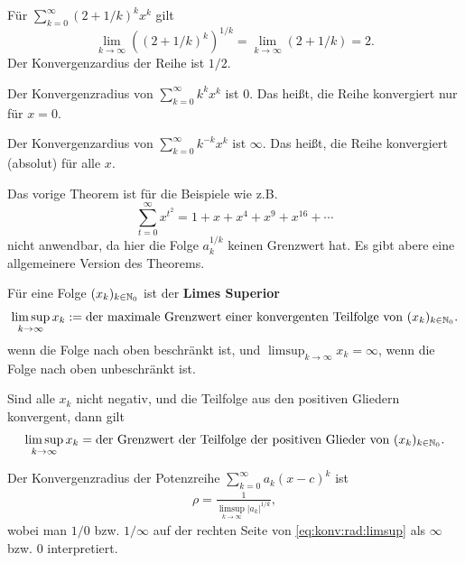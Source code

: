 \begin{bsp} 
	Für $\sum_{k=0}^\infty (2+ 1/k)^k x^k$ gilt 
	\[
		\lim_{k \to \infty} (( 2 + 1/k)^k)^{1/k} = \lim_{k \to \infty} (2 + 1/k)  = 2. 
	\]
	Der Konvergenzardius der Reihe ist $ 1/2$. 
\end{bsp} 

\begin{bsp} 
	Der Konvergenzradius von $\sum_{k=0}^\infty k^k x^k$ ist $0$. Das heißt, die Reihe konvergiert nur für $x=0$. 
\end{bsp} 

\begin{bsp} 
	Der Konvergenzardius von $\sum_{k=0}^\infty k^{-k} x^k$ ist $\infty$. Das heißt, die Reihe konvergiert (absolut) für alle $x$. 
\end{bsp} 

\begin{bem} 
	Das vorige Theorem ist für die Beispiele wie z.B.
	\[
		\sum_{t=0}^\infty x^{t^2} = 1 + x + x^4 + x^9 + x^{16} + \cdots 
	\]
	nicht anwendbar, da hier die Folge $a_k^{1/k}$ keinen Grenzwert hat. Es gibt abere eine allgemeinere Version des Theorems. 
\end{bem} 

\begin{defn} 
	Für eine Folge $(x_k)_{k \in \mathbb{N}_0}$ ist der \textbf{Limes Superior}
	\[
		\limsup_{k \to \infty} x_k := \text{der maximale Grenzwert einer konvergenten Teilfolge von} \ (x_k)_{k \in \mathbb{N}_0}.
	\]
	wenn die Folge nach oben beschränkt ist, und
	$\limsup_{k \to \infty} x_k = \infty$, wenn die Folge nach oben unbeschränkt ist. 
\end{defn}

\begin{bem}
	Sind alle $x_k$ nicht negativ, und die Teilfolge aus den positiven Gliedern konvergent, dann gilt 
	\[
		\limsup_{k \to \infty} x_k = \text{der Grenzwert der Teilfolge der positiven Glieder von} \ (x_k)_{k \in \mathbb{N}_0}.  
	\]
\end{bem} 

\begin{thm}[Update]
	Der Konvergenzradius der Potenzreihe $\sum_{k=0}^\infty a_k (x-c)^k$ ist
	\begin{align}
		\label{eq:konv:rad:limsup}
	\rho = \frac{1}{ \limsup_{k \to \infty} |a_k|^{1/k}},
	\end{align}
	wobei man $1/0$ bzw. $1/\infty$ auf der rechten Seite von \eqref{eq:konv:rad:limsup} als $\infty$ bzw. $0$ interpretiert. 
\end{thm} 

